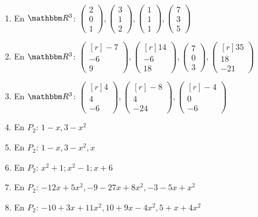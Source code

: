 \begin{enumerate}[resume]
    \item En $\RR[3]$: $\begin{pmatrix} 2 \\ 0 \\ 1 \end{pmatrix}, \begin{pmatrix} 3 \\ 1 \\ 2 \end{pmatrix}, \begin{pmatrix} 1 \\ 1 \\ 1 \end{pmatrix}, \begin{pmatrix} 7 \\ 3 \\ 5 \end{pmatrix}$
    \item En $\RR[3]$: $\begin{pmatrix*}[r] -7 \\ -6 \\ 9 \end{pmatrix*}, \begin{pmatrix*}[r] 14 \\ -6 \\ 18 \end{pmatrix*}, \begin{pmatrix} 7 \\ 0 \\ 3 \end{pmatrix}, \begin{pmatrix*}[r] 35 \\ 18 \\ -21 \end{pmatrix*}$
    \item En $ \RR[3]$: $\begin{pmatrix*}[r] 4 \\ 4 \\ -6 \end{pmatrix*}, \begin{pmatrix*}[r] -8 \\ 4 \\ -24 \end{pmatrix*}, \begin{pmatrix*}[r] -4 \\ 0 \\ -6 \end{pmatrix*}$
    \item En $P_{2}$: $1-x, 3-x^{2}$
    \item En $P_{2}$: $1-x, 3-x^{2}, x$
    \item En $P_{2}$: $x^{2}+1 ; x^{2}-1 ; x+6$
    \item En $P_{2}$: $-12 x+5 x^{2},-9-27 x+8 x^{2},-3-5 x+x^{2}$
    \item En $P_{2}$: $-10+3 x+11 x^{2}, 10+9 x-4 x^{2}, 5+x+4 x^{2}$
\end{enumerate}
